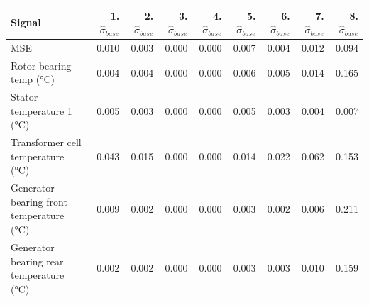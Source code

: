 \begin{tabular}{lrrrrrrrr}
\toprule
Signal & 1. $\hat\sigma_{base}$ & 2. $\hat\sigma_{base}$ & 3. $\hat\sigma_{base}$ & 4. $\hat\sigma_{base}$ & 5. $\hat\sigma_{base}$ & 6. $\hat\sigma_{base}$ & 7. $\hat\sigma_{base}$ & 8. $\hat\sigma_{base}$ \\
\midrule
MSE & 0.010 & 0.003 & 0.000 & 0.000 & 0.007 & 0.004 & 0.012 & 0.094 \\
Rotor bearing temp (°C) & 0.004 & 0.004 & 0.000 & 0.000 & 0.006 & 0.005 & 0.014 & 0.165 \\
Stator temperature 1 (°C) & 0.005 & 0.003 & 0.000 & 0.000 & 0.005 & 0.003 & 0.004 & 0.007 \\
Transformer cell temperature (°C) & 0.043 & 0.015 & 0.000 & 0.000 & 0.014 & 0.022 & 0.062 & 0.153 \\
Generator bearing front temperature (°C) & 0.009 & 0.002 & 0.000 & 0.000 & 0.003 & 0.002 & 0.006 & 0.211 \\
Generator bearing rear temperature (°C) & 0.002 & 0.002 & 0.000 & 0.000 & 0.003 & 0.003 & 0.010 & 0.159 \\
\bottomrule
\end{tabular}
